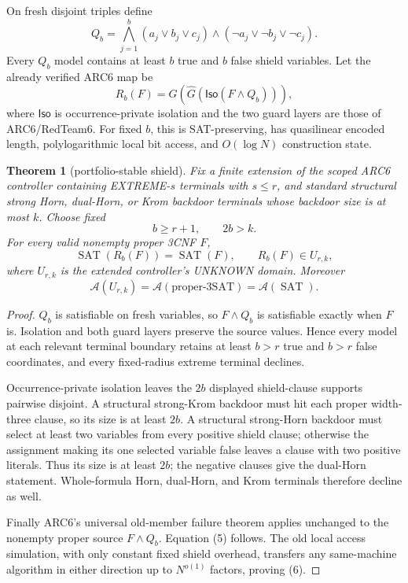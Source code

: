 \documentclass[11pt]{article}
\newtheorem{theorem}{Theorem}
\newcommand{\SAT}{\operatorname{SAT}}
\newcommand{\A}{\mathcal A}
\begin{document}
On fresh disjoint triples define
\[
 Q_b=\bigwedge_{j=1}^{b}
 (a_j\vee b_j\vee c_j)\wedge
 (\neg a_j\vee\neg b_j\vee\neg c_j).              \tag{2}
\]
Every $Q_b$ model contains at least $b$ true and $b$ false shield variables.
Let the already verified ARC6 map be
\[
 R_b(F)=G\!\left(\widehat G\!\left(
       \mathsf{Iso}(F\wedge Q_b)\right)\right),    \tag{3}
\]
where $\mathsf{Iso}$ is occurrence-private isolation and the two guard layers
are those of ARC6/RedTeam6.  For fixed $b$, this is SAT-preserving, has
quasilinear encoded length, polylogarithmic local bit access, and
$O(\log N)$ construction state.

\begin{theorem}[portfolio-stable shield]
Fix a finite extension of the scoped ARC6 controller containing
\textsc{EXTREME-$s$} terminals with $s\le r$, and standard structural strong
Horn, dual-Horn, or Krom backdoor terminals whose backdoor size is at most
$k$.  Choose fixed
\[
 b\ge r+1,\qquad 2b>k.                              \tag{4}
\]
For every valid nonempty proper 3CNF $F$,
\[
 \SAT(R_b(F))=\SAT(F),\qquad R_b(F)\in U_{r,k},     \tag{5}
\]
where $U_{r,k}$ is the extended controller's UNKNOWN domain.  Moreover
\[
 \A(U_{r,k})=\A(\text{proper-3SAT})=\A(\SAT).       \tag{6}
\]
\end{theorem}
\begin{proof}
$Q_b$ is satisfiable on fresh variables, so $F\wedge Q_b$ is satisfiable
exactly when $F$ is.  Isolation and both guard layers preserve the source
values.  Hence every model at each relevant terminal boundary retains at
least $b>r$ true and $b>r$ false coordinates, and every fixed-radius extreme
terminal declines.

Occurrence-private isolation leaves the $2b$ displayed shield-clause
supports pairwise disjoint.  A structural strong-Krom backdoor must hit each
proper width-three clause, so its size is at least $2b$.  A structural
strong-Horn backdoor must select at least two variables from every positive
shield clause; otherwise the assignment making its one selected variable
false leaves a clause with two positive literals.  Thus its size is at least
$2b$; the negative clauses give the dual-Horn statement.  Whole-formula
Horn, dual-Horn, and Krom terminals therefore decline as well.

Finally ARC6's universal old-member failure theorem applies unchanged to the
nonempty proper source $F\wedge Q_b$.  Equation (5) follows.  The old local
access simulation, with only constant fixed shield overhead, transfers any
same-machine algorithm in either direction up to $N^{o(1)}$ factors, proving
(6).
\end{proof}
\end{document}
